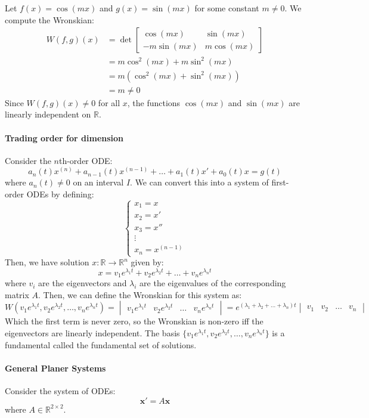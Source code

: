 \documentclass[11pt]{article}
\begin{document}
\begin{example}
    Let $f(x) = \cos (mx)$ and $g(x) = \sin (mx)$ for some constant $m \neq 0$. We compute the Wronskian:
    \begin{align*}
    W(f, g)(x) &= \det\begin{bmatrix}
    \cos(mx) & \sin(mx) \\
    -m\sin(mx) & m\cos(mx)
    \end{bmatrix} \\
    &= m\cos^2(mx) + m\sin^2(mx) \\
    &= m(\cos^2(mx) + \sin^2(mx)) \\
    &= m \neq 0
    \end{align*}
    Since \( W(f, g)(x) \neq 0 \) for all \( x \), the functions \( \cos(mx) \) and \( \sin(mx) \) are linearly independent on \( \mathbb{R} \).
\end{example}
\paragraph{Trading order for dimension} Consider the $n$th-order ODE:
$$a_n(t)x^{(n)} + a_{n-1}(t)x^{(n-1)} + \ldots + a_1(t)x' + a_0(t)x = g(t)$$
where \( a_n(t) \neq 0 \) on an interval \( I \). We can convert this into a system of first-order ODEs by defining:
$$\begin{cases}
x_1 = x \\
x_2 = x' \\
x_3 = x'' \\
\vdots \\
x_n = x^{(n-1)}
\end{cases}$$
Then, we have solution $x: \mathbb{R} \to \mathbb{R}^n$ given by:
$$
x = v_1 e^{\lambda_1 t} + v_2 e^{\lambda_2 t} + \ldots + v_n e^{\lambda_n t}
$$
where \( v_i \) are the eigenvectors and \( \lambda_i \) are the eigenvalues of the corresponding matrix \( A \). Then, we can define the Wronskian for this system as:
\begin{equation}
W(v_1e^{\lambda_1 t}, v_2 e^{\lambda_2 t}, \ldots, v_n e^{\lambda_n t}) = 
\begin{vmatrix}
v_1 e^{\lambda_1 t} & v_2 e^{\lambda_2 t} & \ldots & v_n e^{\lambda_n t} 
\end{vmatrix} = e^{(\lambda_1 + \lambda_2 + \ldots + \lambda_n)t} \begin{vmatrix}
v_1 & v_2 & \ldots & v_n 
\end{vmatrix}
\end{equation}
Which the first term is never zero, so the Wronskian is non-zero iff the eigenvectors are linearly independent. The basis $\{v_1 e^{\lambda_1 t}, v_2 e^{\lambda_2 t}, \ldots, v_n e^{\lambda_n t}\}$ is a fundamental called the fundamental set of solutions.

\paragraph{General Planer Systems} Consider the system of ODEs:
$$\textbf{x}' = A\textbf{x}$$
where \( A \in \mathbb{R}^{2 \times 2} \).
\end{document}

